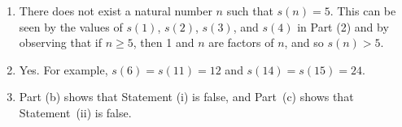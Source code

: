\begin{enumerate}
\begin{enumerate}
\item There does not exist a natural number  $n$  such that  $s( n ) = 5$.  This can be seen by the values of  $s( 1 )$, $s( 2 )$, $s( 3 )$, and 
$s( 4 )$ in Part (2) and by observing that if  $n \geq 5$, then  1  and  $n$  are factors of  $n$, and so  $s( n ) > 5$.

\item Yes.  For example,  $s( 6 ) = s( {11} ) = 12$ and  
$s( {14} ) = s( {15} ) = 24$.

\item Part (b) shows that Statement (i) is false, and Part~(c) shows that Statement~(ii) is false.
\end{enumerate}
\end{enumerate}
\hbreak

\endinput
